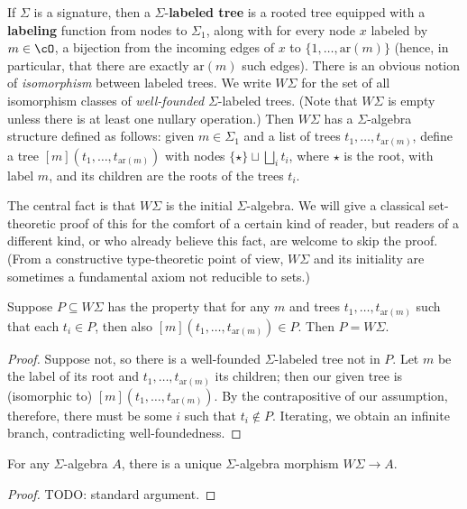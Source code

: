 \documentclass{book}
\def\ay{\mathrm{ar}}
\def\sig{\Sigma}
\def\act#1{[#1]}
\begin{document}
If $\sig$ is a signature, then a $\sig$-\textbf{labeled tree} is a rooted tree equipped with a \textbf{labeling} function from nodes to $\sig_1$, along with for every node $x$ labeled by $m\in\cO$, a bijection from the incoming edges of $x$ to $\{1,\dots,\ay(m)\}$ (hence, in particular, that there are exactly $\ay(m)$ such edges).
There is an obvious notion of \emph{isomorphism} between labeled trees.
We write $W\sig$ for the set of all isomorphism classes of \emph{well-founded} $\sig$-labeled trees.
(Note that $W\sig$ is empty unless there is at least one nullary operation.)
Then $W\sig$ has a $\sig$-algebra structure defined as follows: given $m\in\sig_1$ and a list of trees $t_1,\dots,t_{\ay(m)}$, define a tree $\act m (t_1,\dots,t_{\ay(m)})$ with nodes $\{\star\} \sqcup \bigsqcup_i t_i$, where $\star$ is the root, with label $m$, and its children are the roots of the trees $t_i$.

The central fact is that $W\sig$ is the initial $\sig$-algebra.
We will give a classical set-theoretic proof of this for the comfort of a certain kind of reader, but readers of a different kind, or who already believe this fact, are welcome to skip the proof.
(From a constructive type-theoretic point of view, $W\sig$ and its initiality are sometimes a fundamental axiom not reducible to sets.)

\begin{thm}\label{thm:tree-ind}
  Suppose $P\subseteq W\sig$ has the property that for any $m$ and trees $t_1,\dots,t_{\ay(m)}$ such that each $t_i\in P$, then also $\act m(t_1,\dots,t_{\ay(m)})\in P$.
  Then $P= W\sig$.
\end{thm}
\begin{proof}
  Suppose not, so there is a well-founded $\sig$-labeled tree not in $P$.
  Let $m$ be the label of its root and $t_1,\dots,t_{\ay(m)}$ its children; then our given tree is (isomorphic to) $\act m(t_1,\dots,t_{\ay(m)})$.
  By the contrapositive of our assumption, therefore, there must be some $i$ such that $t_i\notin P$.
  Iterating, we obtain an infinite branch, contradicting well-foundedness.
\end{proof}

\begin{thm}\label{thm:tree-rec}
  For any $\sig$-algebra $A$, there is a unique $\sig$-algebra morphism $W\sig \to A$.
\end{thm}
\begin{proof}
  TODO: standard argument.
\end{proof}
\end{document}
